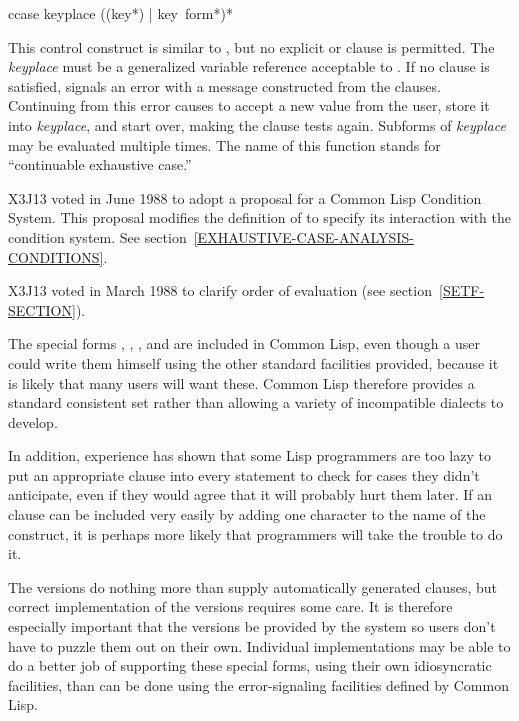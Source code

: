 \begin{defmac}
ccase keyplace {({({key}*) | key} {\,form}*)}*

\begin{obsolete}\noindent
This control construct is similar to ,
but no explicit  or  clause is permitted.
The \emph{keyplace} must be a generalized variable reference
acceptable to .  If no clause is satisfied,  signals an error
with a message constructed from the clauses.  Continuing from this error
causes  to accept a new value from the user, store it into
\emph{keyplace}, and start over, making the clause tests again.  Subforms of
\emph{keyplace} may be evaluated multiple times.  The name of this function
stands for ``continuable exhaustive case.''
\end{obsolete}

\begin{new}
X3J13 voted in June 1988
to adopt a proposal for a Common Lisp Condition System. 
This proposal modifies the definition of  to specify its
interaction with the condition system.
See section~\ref{EXHAUSTIVE-CASE-ANALYSIS-CONDITIONS}.
\end{new}

\begin{newer}
X3J13 voted in March 1988 
to clarify order of evaluation (see section~\ref{SETF-SECTION}).
\end{newer}
\end{defmac}

\beforenoterule
\begin{rationale}
The special forms
, , , and 
are included in Common Lisp, even though a user
could write them himself using the other standard facilities provided,
because it is likely that many users will want these.
Common Lisp therefore provides
a standard consistent set rather than allowing
a variety of incompatible dialects to develop.

In addition, experience has shown that
some Lisp programmers are too lazy to put an appropriate
 clause into every  statement to
check for cases they
didn't anticipate, even if they would agree that it will probably 
hurt them later.  If an  clause can be included
very easily by adding one character to the name of the construct,
it is perhaps more likely that programmers will take the trouble to do it. 

The  versions do nothing more than supply
automatically generated  clauses, but correct
implementation of the  versions
requires some care.  It is therefore especially
important that the  versions be provided
by the system so users don't have to puzzle them out on
their own.  Individual implementations may be able to do a better job
of supporting these special forms,
using their own idiosyncratic facilities, than can be done
using the error-signaling facilities defined by Common Lisp.
\end{rationale}
\afternoterule
